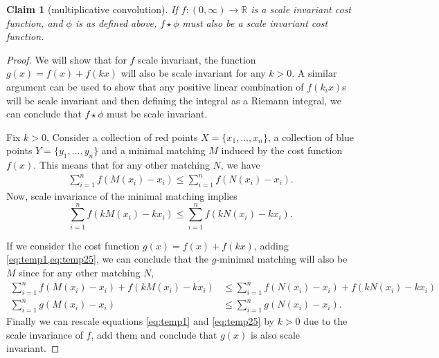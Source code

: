 \documentclass{article}
\newtheorem{claim}{Claim}
\begin{document}
\begin{claim}[{multiplicative }convolution]\label{convolution}
  If $f:(0,\infty)\rightarrow \mathbb{R}$ is a scale invariant cost
  function, and $\phi$ is as defined above, $f\star\phi$ must also be a
  scale invariant cost function.
\end{claim}

\begin{proof}
  We will show that for $f$ scale invariant, the function $g(x) = f(x) +
  f(kx) $ will also be scale invariant for any $k>0$. A similar argument can be used
  to show that any positive linear combination of $f(k_i x)$s  will be
  scale invariant and then defining the integral as a Riemann
  integral, we can conclude that $f\star\phi$ must be scale invariant.

  Fix $k>0$.
  Consider a collection of red points $X=\{x_1,\ldots,x_n\}$, a
  collection of blue points $Y=\{y_1,\ldots, y_n\}$ and a minimal
  matching $M$ induced by
  the cost function $f(x)$. This means that for any other matching $N$, we have
  \begin{align}
    \label{eq:temp1}
    \sum_{i=1}^n f(M(x_i)-x_i )\leq  \sum_{i=1}^n f(N(x_i)-x_i).
  \end{align}
  Now, scale invariance of the minimal matching implies
  \begin{equation}
    \label{eq:temp25}
    \sum_{i=1}^n f(kM(x_i)-kx_i) \leq  \sum_{i=1}^n f(k N(x_i)-kx_i).
  \end{equation}

  If we consider the cost function $g(x) = f(x)+f(kx)$, adding
  \cref{eq:temp1,eq:temp25}, we can conclude that the $g$-minimal
  matching will also
  be $M$ since for any other matching $N$,
  \begin{align*}
    \sum_{i=1}^n f(M(x_i)-x_i) + f(k M(x_i)-kx_i) & \leq
    \sum_{i=1}^n f(N(x_i)-x_i) +f(kN(x_i) -kx_i)\nonumber\\
    \sum_{i=1}^n g(M(x_i)-x_i) &\leq  \sum_{i=1}^n g(N(x_i)-x_i).
  \end{align*}
  Finally we can rescale equations \cref{eq:temp1} and \cref{eq:temp25}
  by $k>0$ due to the scale invariance of $f$, add them and conclude
  that $g(x)$ is also scale invariant.
\end{proof}
\end{document}
